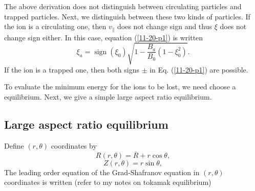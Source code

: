 \documentclass{article}
\newcommand{\tmop}[1]{\ensuremath{\operatorname{#1}}}
\begin{document}
The above derivation does not distinguish between circulating particles and
trapped particles. Next, we distinguish between these two kinds of particles.
If the ion is a circulating one, then $v_{\parallel}$ does not change sign and
thus $\xi$ does not change sign either. In this case, equation
(\ref{11-20-p1}) is written
\begin{equation}
  \label{11-20-e10} \xi_a = \tmop{sign} (\xi_0) \sqrt{1 - \frac{B_a}{B_0} (1 -
  \xi_0^2)} .
\end{equation}
If the ion is a trapped one, then both signs $\pm$ in Eq. (\ref{11-20-p1}) are
possible.

To evaluate the minimum energy for the ions to be lost, we need choose a
equilibrium. Next, we give a simple large aspect ratio equilibrium.

\subsection{Large aspect ratio equilibrium}

Define $(r, \theta)$ coordinates by
\begin{equation}
  R (r, \theta) = \overline{R} + r \cos \theta,
\end{equation}
\begin{equation}
  Z (r, \theta) = r \sin \theta,
\end{equation}
The leading order equation of the Grad-Shafranov equation in $(r, \theta)$
coordinates is written (refer to my notes on tokamak equilibrium)
\end{document}
